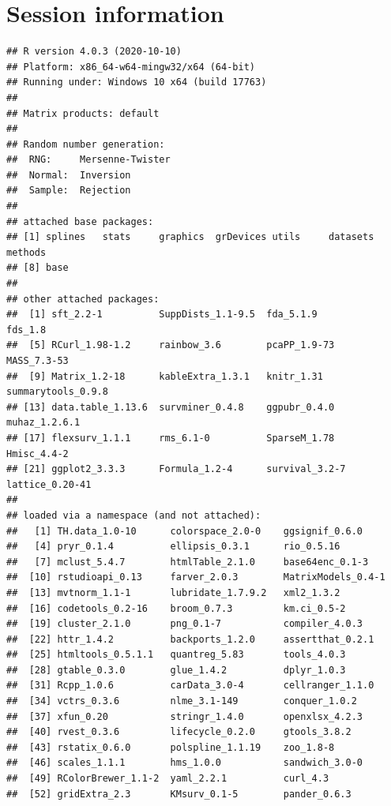 \documentclass[
]{article}
\begin{document}
\newpage

\hypertarget{session-information}{%
\section{Session information}\label{session-information}}

\begin{verbatim}
## R version 4.0.3 (2020-10-10)
## Platform: x86_64-w64-mingw32/x64 (64-bit)
## Running under: Windows 10 x64 (build 17763)
## 
## Matrix products: default
## 
## Random number generation:
##  RNG:     Mersenne-Twister 
##  Normal:  Inversion 
##  Sample:  Rejection 
##  
## attached base packages:
## [1] splines   stats     graphics  grDevices utils     datasets  methods  
## [8] base     
## 
## other attached packages:
##  [1] sft_2.2-1          SuppDists_1.1-9.5  fda_5.1.9          fds_1.8           
##  [5] RCurl_1.98-1.2     rainbow_3.6        pcaPP_1.9-73       MASS_7.3-53       
##  [9] Matrix_1.2-18      kableExtra_1.3.1   knitr_1.31         summarytools_0.9.8
## [13] data.table_1.13.6  survminer_0.4.8    ggpubr_0.4.0       muhaz_1.2.6.1     
## [17] flexsurv_1.1.1     rms_6.1-0          SparseM_1.78       Hmisc_4.4-2       
## [21] ggplot2_3.3.3      Formula_1.2-4      survival_3.2-7     lattice_0.20-41   
## 
## loaded via a namespace (and not attached):
##   [1] TH.data_1.0-10      colorspace_2.0-0    ggsignif_0.6.0     
##   [4] pryr_0.1.4          ellipsis_0.3.1      rio_0.5.16         
##   [7] mclust_5.4.7        htmlTable_2.1.0     base64enc_0.1-3    
##  [10] rstudioapi_0.13     farver_2.0.3        MatrixModels_0.4-1 
##  [13] mvtnorm_1.1-1       lubridate_1.7.9.2   xml2_1.3.2         
##  [16] codetools_0.2-16    broom_0.7.3         km.ci_0.5-2        
##  [19] cluster_2.1.0       png_0.1-7           compiler_4.0.3     
##  [22] httr_1.4.2          backports_1.2.0     assertthat_0.2.1   
##  [25] htmltools_0.5.1.1   quantreg_5.83       tools_4.0.3        
##  [28] gtable_0.3.0        glue_1.4.2          dplyr_1.0.3        
##  [31] Rcpp_1.0.6          carData_3.0-4       cellranger_1.1.0   
##  [34] vctrs_0.3.6         nlme_3.1-149        conquer_1.0.2      
##  [37] xfun_0.20           stringr_1.4.0       openxlsx_4.2.3     
##  [40] rvest_0.3.6         lifecycle_0.2.0     gtools_3.8.2       
##  [43] rstatix_0.6.0       polspline_1.1.19    zoo_1.8-8          
##  [46] scales_1.1.1        hms_1.0.0           sandwich_3.0-0     
##  [49] RColorBrewer_1.1-2  yaml_2.2.1          curl_4.3           
##  [52] gridExtra_2.3       KMsurv_0.1-5        pander_0.6.3       

\end{verbatim}
\end{document}
